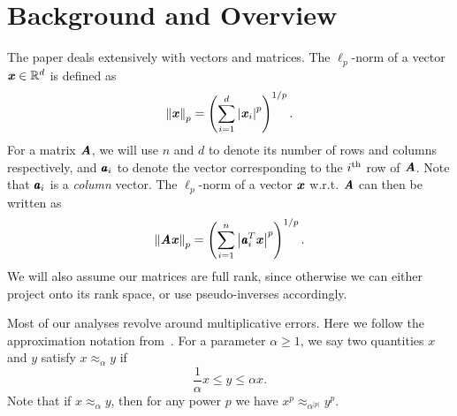 
\section{Background and Overview}
\label{sec:overview}

The paper deals extensively with vectors and matrices.
The $\ell_p$-norm of a vector $\xx \in \Re^{d}$ is defined as
\begin{equation*}
\norm{\xx}_p = \left( \sum_{i = 1}^{d} \left|\xx_i\right|^{p} \right)^{1/p}. 
\end{equation*}
For a matrix $\AA$, we will use $n$ and $d$ to denote its number of
rows and columns respectively, and $\aa_i$ to denote the vector
corresponding to the $i\textsuperscript{th}$ row of $\AA$.
Note that $\aa_i$ is a {\em column} vector.
The $\ell_p$-norm of a vector $\xx$ w.r.t. $\AA$ can then be written as
\begin{equation*}
\norm{\AA \xx}_p = \left( \sum_{i = 1}^{n} \left| \aa_i^T \xx \right|^{p} \right)^{1/p}.
\end{equation*}
We will also assume our matrices are full rank, since otherwise we can
either project onto its rank space, or use pseudo-inverses accordingly.

Most of our analyses revolve around multiplicative errors.
Here we follow the approximation notation from~\cite{CohenLMMPS14:arxiv}.
For a  parameter $\alpha \geq 1$, we say two quantities $x$ and $y$ satisfy
$x \approx_{\alpha} y$ if
\begin{equation*}
\frac{1}{\alpha} x \leq y \leq \alpha x.
\end{equation*}
Note that if $x \approx_{\alpha} y$, then for any power $p$ we have
$x^{p} \approx_{\alpha^{|p|}} y^{p}$.

